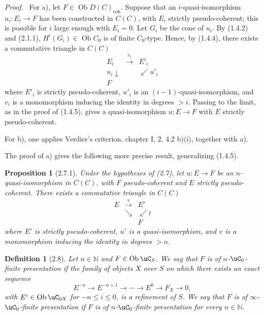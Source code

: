 \documentclass[11pt]{article}
\theoremstyle{plain}
\newtheorem*{proposition*}{Proposition}
\newtheorem*{definition*}{Definition}
\theoremstyle{definition}
\theoremstyle{remark}
\newenvironment{prooftext}{\par\noindent\textit{Proof.}\ }{\par\medskip}
\newcommand{\NN}{\mathbb N}
\DeclareMathOperator{\ob}{Ob}
\providecommand{\S}{\mathcal{S}}
\begin{document}
\begin{prooftext}
For a), let $F\in\ob D(C)_{\mathrm{coh}}$. Suppose that an $i$-quasi-isomorphism $u_i:E_i\to F$ has been constructed in $C(C)$, with $E_i$ strictly pseudo-coherent; this is possible for $i$ large enough with $E_i=0$. Let $G_i$ be the cone of $u_i$. By (1.4.2) and (2.1.1), $H^i(G_i)\in\ob C_0$ is of finite $C_0$-type. Hence, by (1.4.4), there exists a commutative triangle in $C(C)$
\[
\begin{array}{ccc}
E_i&\xrightarrow{v_i}&E'_i\\
u_i\downarrow&&\swarrow u'_i\\
F&&
\end{array}
\]
where $E'_i$ is strictly pseudo-coherent, $u'_i$ is an $(i-1)$-quasi-isomorphism, and $v_i$ is a monomorphism inducing the identity in degrees $>i$. Passing to the limit, as in the proof of (1.4.5), gives a quasi-isomorphism $u:E\to F$ with $E$ strictly pseudo-coherent.

For b), one applies Verdier's criterion, chapter I, \S 2, 4.2 b)(i), together with a).
\end{prooftext}

The proof of a) gives the following more precise result, generalizing (1.4.5).

\begin{proposition*}[2.7.1]
Under the hypotheses of (2.7), let $u:E\to F$ be an $n$-quasi-isomorphism in $C(C)$, with $F$ pseudo-coherent and $E$ strictly pseudo-coherent. There exists a commutative triangle in $C(C)$
\[
\begin{array}{ccc}
E&\xrightarrow{v}&E'\\
&\searrow&\swarrow\wr\\
&&F
\end{array}
\]
where $E'$ is strictly pseudo-coherent, $u'$ is a quasi-isomorphism, and $v$ is a monomorphism inducing the identity in degrees $>n$.
\end{proposition*}

\begin{definition*}[2.8]
Let $n\in\NN$ and $F\in\ob\uC_S$. We say that $F$ is of \emph{$n$-$\uC_0$-finite presentation} if the family of objects $X$ over $S$ on which there exists an exact sequence
\[
E^{-n}\longrightarrow E^{-n+1}\longrightarrow\cdots\longrightarrow E^0\longrightarrow F_X\longrightarrow0,
\]
with $E^i\in\ob\uC_{0X}$ for $-n\leq i\leq0$, is a refinement of $S$. We say that $F$ is of \emph{$\infty$-$\uC_0$-finite presentation} if $F$ is of $n$-$\uC_0$-finite presentation for every $n\in\NN$.
\end{definition*}
\end{document}
